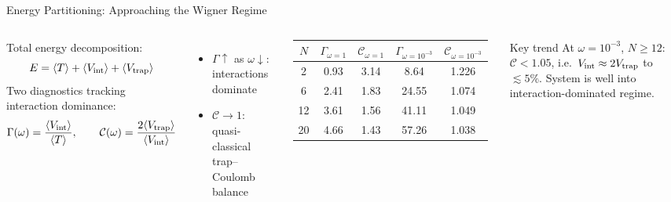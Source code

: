 \documentclass[aspectratio=169,10pt]{beamer}
\begin{document}
\begin{frame}{Energy Partitioning: Approaching the Wigner Regime}
  \begin{columns}[T]
      Total energy decomposition:
      \[
        E = \langle T\rangle
            + \langle V_{\rm int}\rangle
            + \langle V_{\rm trap}\rangle
      \]
      Two diagnostics tracking interaction dominance:
      \[
        \Gamma(\omega)
        = \frac{\langle V_{\rm int}\rangle}{\langle T\rangle},\qquad
        \mathcal{C}(\omega)
        = \frac{2\langle V_{\rm trap}\rangle}{\langle V_{\rm int}\rangle}
      \]
      \begin{itemize}
        \item $\Gamma\!\uparrow$ as $\omega\!\downarrow$: interactions dominate
        \item $\mathcal{C}\to 1$: quasi-classical trap--Coulomb balance
      \end{itemize}
      \scriptsize
      \renewcommand{\arraystretch}{1.2}
      \begin{tabular}{c|cc|cc}
        \toprule
        $N$ & $\Gamma_{\omega=1}$ & $\mathcal{C}_{\omega=1}$
            & $\Gamma_{\omega=10^{-3}}$ & $\mathcal{C}_{\omega=10^{-3}}$ \\
        \midrule
        2  & 0.93 & 3.14 & 8.64  & 1.226 \\
        6  & 2.41 & 1.83 & 24.55 & 1.074 \\
        12 & 3.61 & 1.56 & 41.11 & 1.049 \\
        20 & 4.66 & 1.43 & 57.26 & 1.038 \\
        \bottomrule
      \end{tabular}
      \normalsize
      \vspace{0.3cm}
      \begin{alertblock}{Key trend}
        At $\omega=10^{-3}$, $N\ge 12$: $\mathcal{C}< 1.05$, i.e.\
        $V_{\rm int}\approx 2V_{\rm trap}$ to $\lesssim 5\%$.
        System is well into interaction-dominated regime.
      \end{alertblock}
  \end{columns}
\end{frame}
\end{document}
